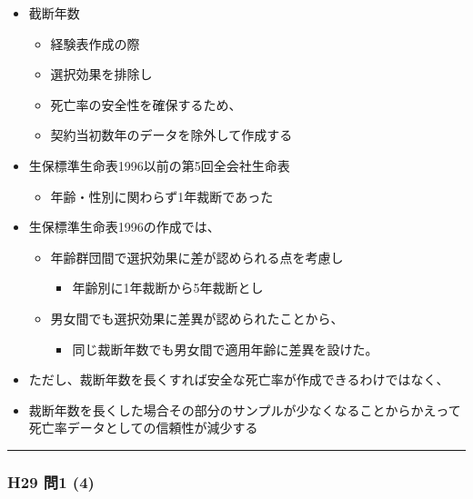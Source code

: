 \documentclass[
]{article}
\providecommand{\tightlist}{%
  \setlength{\itemsep}{0pt}\setlength{\parskip}{0pt}}
\begin{document}
\begin{itemize}
\tightlist
\item
  截断年数

  \begin{itemize}
  \tightlist
  \item
    経験表作成の際
  \item
    選択効果を排除し
  \item
    死亡率の安全性を確保するため、
  \item
    契約当初数年のデータを除外して作成する
  \end{itemize}
\item
  生保標準生命表1996以前の第5回全会社生命表

  \begin{itemize}
  \tightlist
  \item
    年齢・性別に関わらず1年裁断であった
  \end{itemize}
\item
  生保標準生命表1996の作成では、

  \begin{itemize}
  \tightlist
  \item
    年齢群団間で選択効果に差が認められる点を考慮し

    \begin{itemize}
    \tightlist
    \item
      年齢別に1年裁断から5年裁断とし
    \end{itemize}
  \item
    男女間でも選択効果に差異が認められたことから、

    \begin{itemize}
    \tightlist
    \item
      同じ裁断年数でも男女間で適用年齢に差異を設けた。
    \end{itemize}
  \end{itemize}
\item
  ただし、裁断年数を長くすれば安全な死亡率が作成できるわけではなく、
\item
  裁断年数を長くした場合その部分のサンプルが少なくなることからかえって死亡率データとしての信頼性が減少する
\end{itemize}

\begin{center}\rule{0.5\linewidth}{0.5pt}\end{center}

\hypertarget{h29-ux554f1-4}{%
\subsubsection{H29 問1 (4)}\label{h29-ux554f1-4}}
\end{document}
